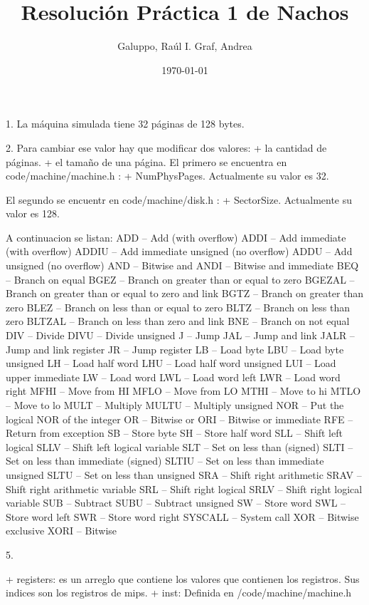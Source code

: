 \documentclass[a4paper, 11pt]{article}
\title{Resolución Práctica 1 de Nachos}
\author{Galuppo, Raúl I. Graf, Andrea}
\date{\today}
\begin{document}
\maketitle

1.  La máquina simulada tiene 32 páginas de 128 bytes.

2.  Para cambiar ese valor hay que modificar dos valores:
            + la cantidad de páginas.
            + el tamaño de una página.
    El primero se encuentra en code/machine/machine.h :
        + NumPhysPages. Actualmente su valor es 32.

    El segundo se encuentr en code/machine/disk.h :
        + SectorSize. Actualmente su valor es 128.


 A continuacion se listan:
ADD – Add (with overflow)
ADDI -- Add immediate (with overflow)
ADDIU -- Add immediate unsigned (no overflow)
ADDU -- Add unsigned (no overflow)
AND -- Bitwise and
ANDI -- Bitwise and immediate
BEQ -- Branch on equal
BGEZ -- Branch on greater than or equal to zero
BGEZAL -- Branch on greater than or equal to zero and link
BGTZ -- Branch on greater than zero
BLEZ -- Branch on less than or equal to zero
BLTZ -- Branch on less than zero
BLTZAL -- Branch on less than zero and link
BNE -- Branch on not equal
DIV -- Divide
DIVU -- Divide unsigned
J -- Jump
JAL -- Jump and link
JALR -- Jump and link register
JR -- Jump register
LB -- Load byte
LBU -- Load byte unsigned
LH -- Load half word
LHU -- Load half word unsigned
LUI -- Load upper immediate
LW -- Load word
LWL -- Load word left
LWR -- Load word right
MFHI -- Move from HI
MFLO -- Move from LO
MTHI -- Move to hi
MTLO -- Move to lo
MULT -- Multiply
MULTU -- Multiply unsigned
NOR -- Put the logical NOR of the integer
OR -- Bitwise or
ORI -- Bitwise or immediate
RFE -- Return from exception
SB -- Store byte
SH -- Store half word 
SLL -- Shift left logical
SLLV -- Shift left logical variable
SLT -- Set on less than (signed)
SLTI -- Set on less than immediate (signed)
SLTIU -- Set on less than immediate unsigned
SLTU -- Set on less than unsigned
SRA -- Shift right arithmetic
SRAV -- Shift right arithmetic variable
SRL -- Shift right logical
SRLV -- Shift right logical variable
SUB -- Subtract
SUBU -- Subtract unsigned
SW -- Store word
SWL -- Store word left
SWR -- Store word right
SYSCALL -- System call
XOR -- Bitwise exclusive
XORI -- Bitwise

5.

+ registers:  es un arreglo que contiene los valores que contienen los registros. Sus indices son los registros de mips.
+ inst: Definida en /code/machine/machine.h
\end{document}
